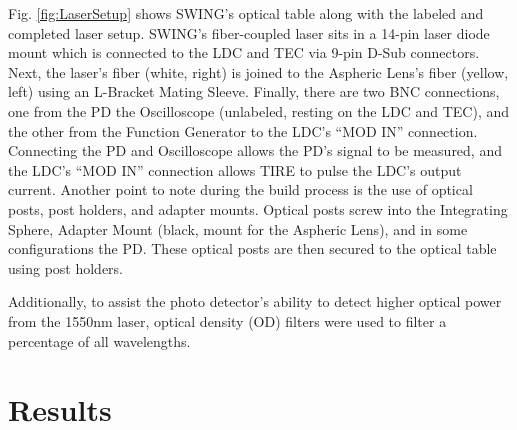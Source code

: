 \documentclass[journal,twoside,web]{ieeecolor}
\begin{document}
Fig. \ref{fig:LaserSetup} shows SWING’s optical table along with the labeled and completed laser setup. SWING’s fiber-coupled laser sits in a 14-pin laser diode mount which is connected to the LDC and TEC via 9-pin D-Sub connectors. Next, the laser’s fiber (white, right) is joined to the Aspheric Lens’s fiber (yellow, left) using an L-Bracket Mating Sleeve. Finally, there are two BNC connections, one from the PD the Oscilloscope (unlabeled, resting on the LDC and TEC), and the other from the Function Generator to the LDC’s “MOD IN” connection. Connecting the PD and Oscilloscope allows the PD’s signal to be measured, and the LDC’s “MOD IN” connection allows TIRE to pulse the LDC’s output current. Another point to note during the build process is the use of optical posts, post holders, and adapter mounts. Optical posts screw into the Integrating Sphere, Adapter Mount (black, mount for the Aspheric Lens), and in some configurations the PD. These optical posts are then secured to the optical table using post holders. 

Additionally, to assist the photo detector's ability to detect higher optical power from the 1550nm laser, optical density (OD) filters were used to filter a percentage of all wavelengths. 


\section{Results}
\end{document}
